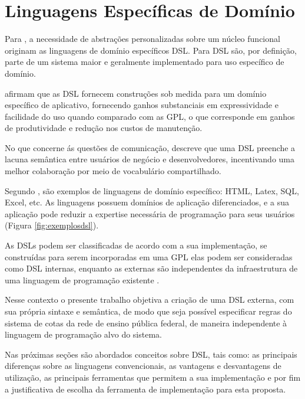 \section{Linguagens Específicas de Domínio}
\label{sec:dsl}

Para , a necessidade de abstrações personalizadas sobre um núcleo funcional originam as linguagens de domínio específicos \gls{DSL}. Para  \gls{DSL} são, por definição, parte de um sistema maior e geralmente implementado para uso específico de domínio.

 afirmam que as \gls{DSL} fornecem construções sob medida para um domínio específico de aplicativo, fornecendo ganhos substanciais em expressividade e facilidade do uso quando comparado com as \gls{GPL}, o que corresponde em ganhos de produtividade e redução nos custos de manutenção.

No que concerne ás questões de comunicação,  descreve que uma \gls{DSL} preenche a lacuna semântica entre usuários de negócio e desenvolvedores, incentivando uma melhor colaboração por meio de vocabulário compartilhado.  

Segundo , são exemplos de linguagens de domínio específico: HTML, Latex, SQL, Excel, etc. As linguagens possuem domínios de aplicação diferenciados, e a sua aplicação pode reduzir a expertise necessária de programação para seus usuários (Figura \ref{fig:exemplosdsl}).





As \gls{DSL}s podem ser classificadas de acordo com a sua implementação, se construídas para serem incorporadas em uma \gls{GPL} elas podem ser consideradas como \gls{DSL} internas, enquanto as externas são independentes da infraestrutura de uma linguagem de programação existente \cite{dslengineering}.

Nesse contexto o presente trabalho objetiva a criação de uma \gls{DSL} externa, com sua própria sintaxe e semântica, de modo que seja possível especificar regras do sistema de cotas da rede de ensino pública federal, de maneira independente à linguagem de programação alvo do sistema. 

Nas próximas seções são abordados conceitos sobre \gls{DSL}, tais como: as principais diferenças sobre as linguagens convencionais, as vantagens e desvantagens de utilização, as principais ferramentas que permitem a sua implementação e por fim a justificativa de escolha da ferramenta de implementação para esta proposta. 



